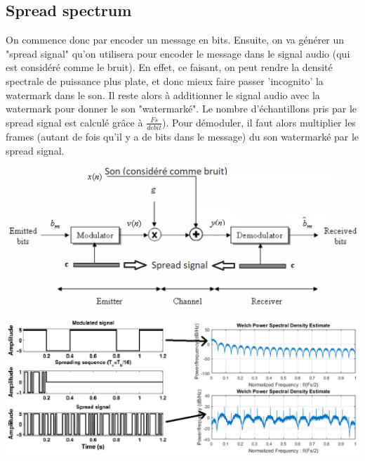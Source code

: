 \documentclass[letterpaper, 12pt]{article}
\newcommand{\alinea}{
\hspace*{0.5cm}}
\begin{document}
		\subsection{Spread spectrum}
			\alinea On commence donc par encoder un message en bits. Ensuite, on va générer un "spread signal" qu'on utilisera pour
				encoder le message dans le signal audio (qui est considéré comme le bruit). En effet, ce faisant, on peut
				rendre la densité spectrale de puissance plus plate, et donc mieux faire passer 'incognito' la watermark dans le son.
				Il reste alors à additionner le signal audio avec la watermark pour donner le son "watermarké".
				Le nombre d'échantillons pris par le spread signal est calculé grâce à $\frac{Fs}{debit}$). Pour démoduler,
				il faut alors multiplier les frames (autant de fois qu'il y a de bits dans le message) du son watermarké par 
				le spread signal. 
				\begin{center}
					\includegraphics[width=6in]{Images/watermark}
				\end{center}
				\begin{center}
					\includegraphics[width=6.5in]{Images/watermark-psd}
				\end{center}
\end{document}
